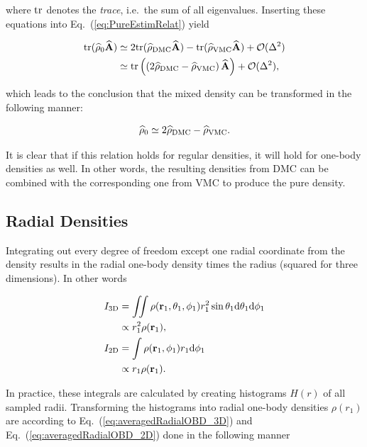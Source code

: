 where $\mathrm{tr}$ denotes the \textit{trace}, i.e.~the sum of all eigenvalues. Inserting these equations into Eq.~(\ref{eq:PureEstimRelat}) yield

\begin{align}
 \mathrm{tr}({\bf\widehat{\rho}}_0{\bf\widehat{A}}) &\simeq 2\mathrm{tr}({\bf\widehat{\rho}}_\mathrm{DMC}{\bf\widehat{A}}) -  \mathrm{tr}({\bf\widehat{\rho}}_\mathrm{VMC}{\bf\widehat{A}}) + \mathcal{O}(\Delta^2) \notag\\
  &\simeq \mathrm{tr}\left(\left(2{\bf\widehat{\rho}}_\mathrm{DMC} - {\bf\widehat{\rho}}_\mathrm{VMC}\right){\bf\widehat{A}}\right) + \mathcal{O}(\Delta^2),
\end{align}

which leads to the conclusion that the mixed density can be transformed in the following manner:

\begin{equation}
 {\bf\widehat{\rho}}_0 \simeq 2{\bf\widehat{\rho}}_\mathrm{DMC} - {\bf\widehat{\rho}}_\mathrm{VMC} .\label{eq:densityTransform}
\end{equation}

It is clear that if this relation holds for regular densities, it will hold for one-body densities as well. In other words, the resulting densities from DMC can be combined with the corresponding one from VMC to produce the pure density.

\subsection{Radial Densities}

Integrating out every degree of freedom except one radial coordinate from the density results in the radial one-body density times the radius (squared for three dimensions). In other words

\begin{align}
 I_\mathrm{3D} &= \iint \rho (\mathbf{r}_1, \theta_1, \phi_1)r_1^2\sin\theta_1\mathrm{d}\theta_1\mathrm{d}\phi_1 \notag\\
   &\propto r_1^2\rho(\mathbf{r}_1), \label{eq:averagedRadialOBD_3D} \\
 I_\mathrm{2D} &= \int \rho (\mathbf{r}_1, \phi_1)r_1\mathrm{d}\phi_1 \notag\\
   &\propto r_1\rho(\mathbf{r}_1). \label{eq:averagedRadialOBD_2D}
\end{align}

In practice, these integrals are calculated by creating histograms $H(r)$ of all sampled radii. Transforming the histograms into radial one-body densities $\rho(r_1)$ are according to Eq.~(\ref{eq:averagedRadialOBD_3D}) and Eq.~(\ref{eq:averagedRadialOBD_2D}) done in the following manner

